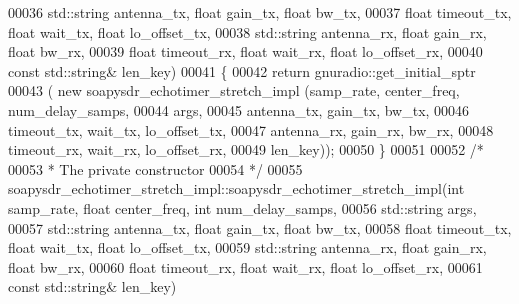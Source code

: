 \begin{DoxyCode}
00036                               std::string antenna\_tx, \textcolor{keywordtype}{float} gain\_tx, \textcolor{keywordtype}{float} bw\_tx,
00037                               \textcolor{keywordtype}{float} timeout\_tx, \textcolor{keywordtype}{float} wait\_tx, \textcolor{keywordtype}{float} lo\_offset\_tx,
00038                               std::string antenna\_rx, \textcolor{keywordtype}{float} gain\_rx, \textcolor{keywordtype}{float} bw\_rx,
00039                               \textcolor{keywordtype}{float} timeout\_rx, \textcolor{keywordtype}{float} wait\_rx, \textcolor{keywordtype}{float} lo\_offset\_rx,
00040                               \textcolor{keyword}{const} std::string& len\_key)
00041     \{
00042       \textcolor{keywordflow}{return} gnuradio::get\_initial\_sptr
00043       ( \textcolor{keyword}{new} soapysdr_echotimer_stretch_impl (samp\_rate, center\_freq, num\_delay\_samps,
00044                                         args,
00045                                         antenna\_tx, gain\_tx, bw\_tx,
00046                                         timeout\_tx, wait\_tx, lo\_offset\_tx,
00047                                         antenna\_rx, gain\_rx, bw\_rx,
00048                                         timeout\_rx, wait\_rx, lo\_offset\_rx,
00049                                         len\_key));
00050     \}
00051 
00052     \textcolor{comment}{/*}
00053 \textcolor{comment}{     * The private constructor}
00054 \textcolor{comment}{     */}
00055     soapysdr_echotimer_stretch_impl::soapysdr_echotimer_stretch_impl(\textcolor{keywordtype}{int} 
      samp_rate, \textcolor{keywordtype}{float} center_freq, \textcolor{keywordtype}{int} num\_delay\_samps,
00056                                                       std::string args,
00057                                                       std::string antenna\_tx, \textcolor{keywordtype}{float} gain\_tx, \textcolor{keywordtype}{float} bw\_tx,
00058                                                       \textcolor{keywordtype}{float} timeout\_tx, \textcolor{keywordtype}{float} wait\_tx, \textcolor{keywordtype}{float} lo\_offset\_tx,
00059                                                       std::string antenna\_rx, \textcolor{keywordtype}{float} gain\_rx, \textcolor{keywordtype}{float} bw\_rx,
00060                                                       \textcolor{keywordtype}{float} timeout\_rx, \textcolor{keywordtype}{float} wait\_rx, \textcolor{keywordtype}{float} lo\_offset\_rx,
00061                                                       \textcolor{keyword}{const} std::string& len\_key)

\end{DoxyCode}
